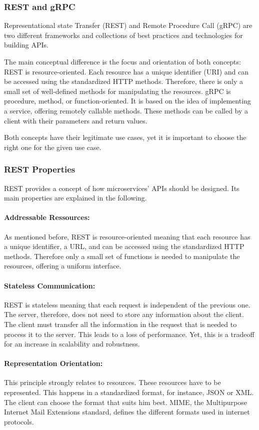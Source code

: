 \subsubsection*{REST and gRPC}
Representational state Transfer (REST) and Remote Procedure Call (gRPC) are two different frameworks and collections of best practices and technologies for building APIs.

The main conceptual difference is the focus and orientation of both concepts:
REST is resource-oriented.
Each resource has a unique identifier (URI) and can be accessed using the standardized HTTP methods.
Therefore, there is only a small set of well-defined methods for manipulating the resources.
gRPC is procedure, method, or function-oriented.
It is based on the idea of implementing a service, offering remotely callable methods.
These methods can be called by a client with their parameters and return values.

Both concepts have their legitimate use cases, yet it is important to choose the right one for the given use case.

\subsubsection*{REST Properties}
REST provides a concept of how microservices' APIs should be designed.
Its main properties are explained in the following.

\paragraph*{Addressable Ressources:}
As mentioned before, REST is resource-oriented meaning that each resource has a unique identifier, a URL, and can be accessed using the standardized HTTP methods.
Therefore only a small set of functions is needed to manipulate the resources, offering a uniform interface.

\paragraph*{Stateless Communication:}
REST is stateless meaning that each request is independent of the previous one.
The server, therefore, does not need to store any information about the client.
The client must transfer all the information in the request that is needed to process it to the server.
This leads to a loss of performance.
Yet, this is a tradeoff for an increase in scalability and robustness.

\paragraph*{Representation Orientation:}
This principle strongly relates to resources.
These resources have to be represented.
This happens in a standardized format, for instance, JSON or XML.
The client can choose the format that suits him best.
MIME, the Multipurpose Internet Mail Extensions standard, defines the different formats used in internet protocols.

